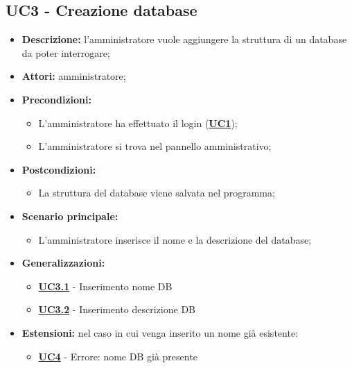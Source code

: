 \subsection{UC3 - Creazione database}
\label{sec:UC3}
\begin{itemize}
	\item \textbf{Descrizione:} l’amministratore vuole aggiungere la struttura di un database da poter interrogare;
	\item \textbf{Attori:} amministratore;
	\item \textbf{Precondizioni:} 
	\begin{itemize}
		\item L’amministratore ha effettuato il login (\hyperref[sec:UC1]{\textbf{UC1}});
		\item L’amministratore si trova nel pannello amministrativo;
	\end{itemize}
	\item \textbf{Postcondizioni:} 
	\begin{itemize}
		\item La struttura del database viene salvata nel programma;
	\end{itemize}
	\item \textbf{Scenario principale:} 
	\begin{itemize}
		\item L’amministratore inserisce il nome e la descrizione del database;
	\end{itemize}
	\item \textbf{Generalizzazioni:} 
	\begin{itemize}
		\item \hyperref[sec:UC3.1]{\textbf{UC3.1}} - Inserimento nome DB
		\item \hyperref[sec:UC3.2]{\textbf{UC3.2}} - Inserimento descrizione DB
	\end{itemize}
	\item \textbf{Estensioni:} nel caso in cui venga inserito un nome già esistente:
	\begin{itemize}
		\item \hyperref[sec:UC4]{\textbf{UC4}} - Errore: nome DB già presente
	\end{itemize}
\end{itemize}

